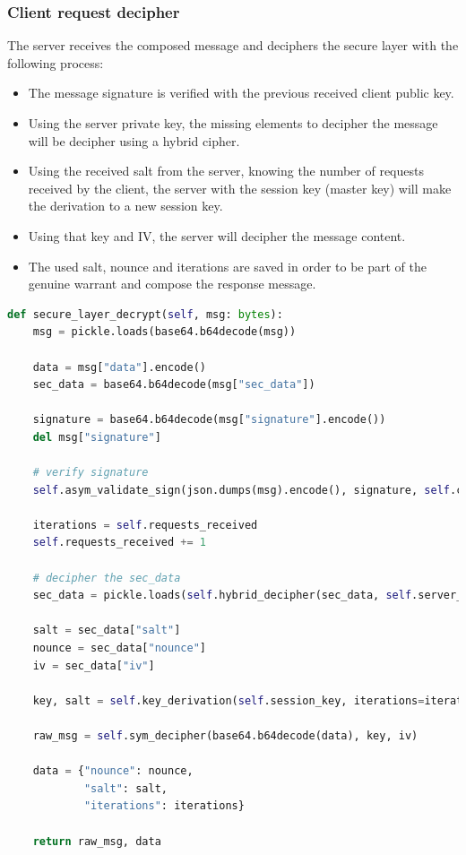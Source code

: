 \documentclass[pdftex,12pt,a4paper]{report}
\begin{document}
\subsubsection{Client request decipher}

The server receives the composed message and deciphers the secure layer with the following process:

\begin{itemize}
    \item {
        The message signature is verified with the previous received client public key.
    } 
    \item {
        Using the server private key, the missing elements to decipher the message will be decipher using a hybrid cipher.
    }
    \item{
        Using the received salt from the server, knowing the number of requests received by the client, the server with the session key (master key) will make the derivation to a new session key.
    }
    \item{
        Using that key and IV, the server will decipher the message content.
    }
    \item{
        The used salt, nounce and iterations are saved in order to be part of the genuine warrant and compose the response message. 
    }
\end{itemize}

\begin{lstlisting}[language=Python]
def secure_layer_decrypt(self, msg: bytes):
    msg = pickle.loads(base64.b64decode(msg))

    data = msg["data"].encode()
    sec_data = base64.b64decode(msg["sec_data"])

    signature = base64.b64decode(msg["signature"].encode())
    del msg["signature"]

    # verify signature
    self.asym_validate_sign(json.dumps(msg).encode(), signature, self.client_public_key)

    iterations = self.requests_received
    self.requests_received += 1

    # decipher the sec_data
    sec_data = pickle.loads(self.hybrid_decipher(sec_data, self.server_priv_key))

    salt = sec_data["salt"]
    nounce = sec_data["nounce"]
    iv = sec_data["iv"]

    key, salt = self.key_derivation(self.session_key, iterations=iterations, salt=salt)

    raw_msg = self.sym_decipher(base64.b64decode(data), key, iv)

    data = {"nounce": nounce,
            "salt": salt,
            "iterations": iterations}

    return raw_msg, data
\end{lstlisting}
\end{document}
